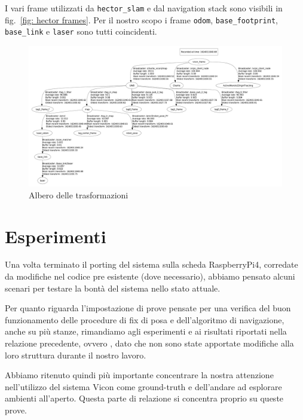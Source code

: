 I vari frame utilizzati da \texttt{hector\_slam} e dal navigation stack sono visibili in fig.~\ref{fig: hector frames}. Per il nostro scopo i frame \texttt{odom}, \texttt{base\_footprint}, \texttt{base\_link} e \texttt{laser} sono tutti coincidenti.


\begin{figure}[]
	\centering
	\includegraphics[width=\linewidth]{tf_tree.pdf}
	\caption{Albero delle trasformazioni}
	\label{fig: rqt_tf_tree}
\end{figure}

\FloatBarrier

\newpage
\section{Esperimenti}

Una volta terminato il porting del sistema sulla scheda RaspberryPi4, corredate da modifiche nel codice pre esistente (dove necessario), abbiamo pensato alcuni scenari per testare la bontà del sistema nello stato attuale. 

Per quanto riguarda l'impostazione di prove pensate per una verifica del buon funzionamento delle procedure di fix di posa e dell'algoritmo di navigazione, anche su più stanze, rimandiamo agli esperimenti e ai risultati riportati nella relazione precedente, ovvero \cite{ptvlocalizzazione}, dato che non sono state apportate modifiche alla loro struttura durante il nostro lavoro. 

Abbiamo ritenuto quindi pi\`u importante concentrare la nostra attenzione nell'utilizzo del sistema Vicon come ground-truth e dell'andare ad esplorare ambienti all'aperto.
Questa parte di relazione si concentra proprio su queste prove. 


